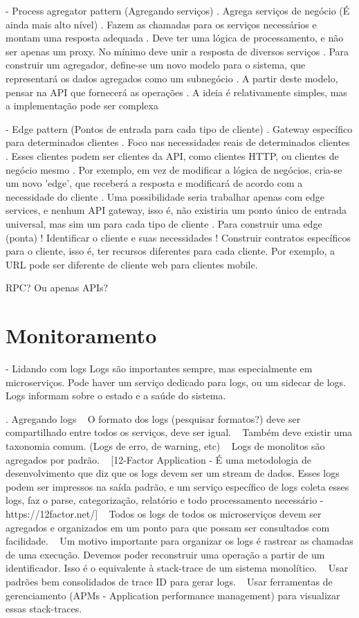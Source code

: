 - Process agregator pattern (Agregando serviços)
    . Agrega serviços de negócio (É ainda mais alto nível)
    . Fazem as chamadas para os serviços necessários e montam uma resposta adequada
    . Deve ter uma lógica de processamento, e não ser apenas um proxy. No mínimo deve unir a resposta de diversos serviços
    . Para construir um agregador, define-se um novo modelo para o sistema, que representará os dados agregados como um subnegócio
    . A partir deste modelo, pensar na API que fornecerá as operações
    . A ideia é relativamente simples, mas a implementação pode ser complexa

- Edge pattern (Pontos de entrada para cada tipo de cliente)
    . Gateway específico para determinados clientes
    . Foco nas necessidades reais de determinados clientes
    . Esses clientes podem ser clientes da API, como clientes HTTP, ou clientes de negócio mesmo
    . Por exemplo, em vez de modificar a lógica de negócios, cria-se um novo 'edge', que receberá a resposta e modificará de acordo com a necessidade do cliente
    . Uma possibilidade seria trabalhar apenas com edge services, e nenhum API gateway, isso é, não existiria um ponto único de entrada universal, mas sim um para cada tipo de cliente
    . Para construir uma edge (ponta)
        ! Identificar o cliente e suas necessidades
        ! Construir contratos específicos para o cliente, isso é, ter recursos diferentes para cada cliente. Por exemplo, a URL pode ser diferente de cliente web para clientes mobile.

RPC? Ou apenas APIs?

\section{Monitoramento}

- Lidando com logs
    Logs são importantes sempre, mas especialmente em microserviços. Pode haver um serviço dedicado para logs, ou um sidecar de logs. Logs informam sobre o estado e a saúde do sistema.

    . Agregando logs
        ~ O formato dos logs (pesquisar formatos?) deve ser compartilhado entre todos os serviços, deve ser igual.
        ~ Também deve existir uma taxonomia comum. (Logs de erro, de warning, etc)
        ~ Logs de monolitos são agregados por padrão. 
        ~ [12-Factor Application - É uma metodologia de desenvolvimento que diz que os logs devem ser um stream de dados. Esses logs podem ser impressos na saída padrão, e um serviço específico de logs coleta esses logs, faz o parse, categorização, relatório e todo processamento necessário - https://12factor.net/]
        ~ Todos os logs de todos os microserviços devem ser agregados e organizados em um ponto para que possam ser consultados com facilidade.
        ~ Um motivo importante para organizar os logs é rastrear as chamadas de uma execução. Devemos poder reconstruir uma operação a partir de um identificador. Isso é o equivalente à stack-trace de um sistema monolítico.
        ~ Usar padrões bem consolidados de trace ID para gerar logs.
        ~ Usar ferramentas de gerenciamento (APMs - Application performance management) para visualizar essas stack-traces.

